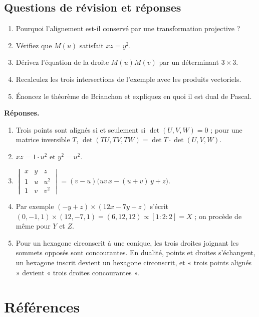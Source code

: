 \subsection{Questions de révision et réponses}
\begin{enumerate}
 \item Pourquoi l'alignement est-il conservé par une transformation projective ?
 \item Vérifiez que $M(u)$ satisfait $xz=y^2$.
 \item Dérivez l'équation de la droite $M(u)M(v)$ par un déterminant $3\times3$.
 \item Recalculez les trois intersections de l'exemple avec les produits vectoriels.
 \item Énoncez le théorème de Brianchon et expliquez en quoi il est dual de Pascal.
\end{enumerate}
\textbf{Réponses.}
\begin{enumerate}
 \item Trois points sont alignés si et seulement si $\det(U,V,W)=0$ ; pour une matrice inversible $T$, $\det(TU,TV,TW)=\det T\cdot\det(U,V,W)$.
 \item $x z=1\cdot u^2$ et $y^2=u^2$.
 \item $\begin{vmatrix}x&y&z\\1&u&u^2\\1&v&v^2\end{vmatrix}=(v-u)\bigl(uv\,x-(u+v)\,y+z\bigr)$.
 \item Par exemple $(-y+z)\times(12x-7y+z)$ s'écrit $(0,-1,1)\times(12,-7,1)=(6,12,12)\propto[1:2:2]=X$ ; on procède de même pour $Y$ et $Z$.
 \item Pour un hexagone circonscrit à une conique, les trois droites joignant les sommets opposés sont concourantes. En dualité, points et droites s'échangent, un hexagone inscrit devient un hexagone circonscrit, et « trois points alignés » devient « trois droites concourantes ».
\end{enumerate}

\section*{Références}
\begin{enumerate}
\end{enumerate}

